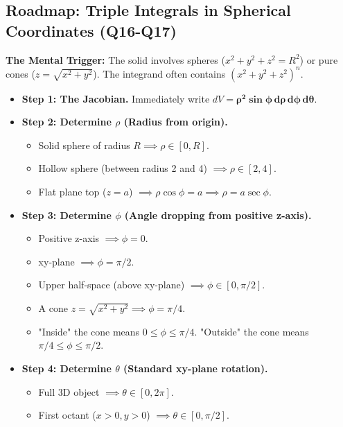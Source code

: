 \documentclass[11pt]{article}
\begin{document}
\subsection{Roadmap: Triple Integrals in Spherical Coordinates (Q16-Q17)}
\textbf{The Mental Trigger:} The solid involves spheres ($x^2+y^2+z^2 = R^2$) or pure cones ($z=\sqrt{x^2+y^2}$). The integrand often contains $(x^2+y^2+z^2)^{n}$.
\begin{itemize}
    \item \textbf{Step 1: The Jacobian.} Immediately write $dV = \mathbf{\rho^2 \sin\phi \, d\rho \, d\phi \, d\theta}$.
    \item \textbf{Step 2: Determine $\rho$ (Radius from origin).}
    \begin{itemize}
        \item Solid sphere of radius $R \implies \rho \in [0, R]$.
        \item Hollow sphere (between radius 2 and 4) $\implies \rho \in [2, 4]$.
        \item Flat plane top ($z=a$) $\implies \rho\cos\phi = a \implies \rho = a\sec\phi$.
    \end{itemize}
    \item \textbf{Step 3: Determine $\phi$ (Angle dropping from positive z-axis).}
    \begin{itemize}
        \item Positive z-axis $\implies \phi = 0$.
        \item xy-plane $\implies \phi = \pi/2$.
        \item Upper half-space (above xy-plane) $\implies \phi \in [0, \pi/2]$.
        \item A cone $z = \sqrt{x^2+y^2} \implies \phi = \pi/4$.
        \item "Inside" the cone means $0 \le \phi \le \pi/4$. "Outside" the cone means $\pi/4 \le \phi \le \pi/2$.
    \end{itemize}
    \item \textbf{Step 4: Determine $\theta$ (Standard xy-plane rotation).}
    \begin{itemize}
        \item Full 3D object $\implies \theta \in [0, 2\pi]$.
        \item First octant ($x>0, y>0$) $\implies \theta \in [0, \pi/2]$.
    \end{itemize}
\end{itemize}
\end{document}
